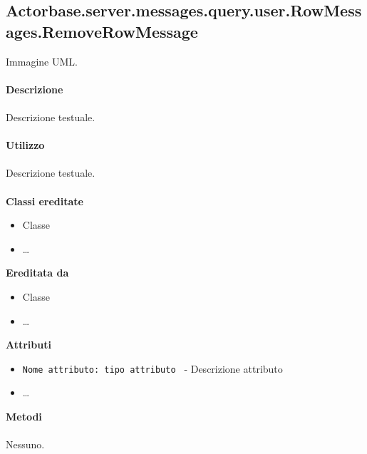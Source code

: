 \documentclass[a4paper]{article}
\begin{document}
	\subsection{Actorbase.server.messages.query.user.RowMessages.RemoveRowMessage}
		Immagine UML.
		\\ \\
		\textbf{Descrizione}
			\\ \\
			Descrizione testuale.
			\\ \\
		\textbf{Utilizzo}
			\\ \\
			Descrizione testuale.
			\\ \\
		\textbf{Classi ereditate}
			\begin{itemize}
				\item Classe
				\item \dots
			\end{itemize}
		\textbf{Ereditata da}
			\begin{itemize}
				\item Classe
				\item \dots
			\end{itemize}
		\textbf{Attributi}
			\begin{itemize}
				\item \texttt{Nome attributo: tipo attributo } - Descrizione attributo
				\item \dots
			\end{itemize}
		\textbf{Metodi}
			\\ \\
			Nessuno.	
			
\end{document}
